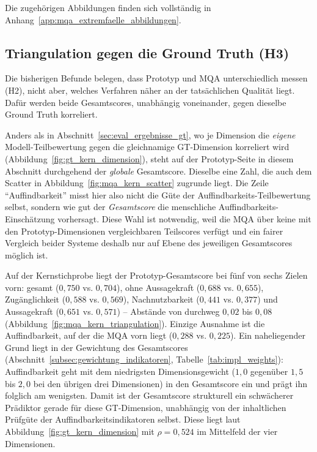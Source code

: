 Die zugehörigen Abbildungen finden sich vollständig in Anhang~\ref{app:mqa_extremfaelle_abbildungen}.

\subsection{Triangulation gegen die Ground Truth (H3)}

Die bisherigen Befunde belegen, dass Prototyp und MQA unterschiedlich messen (H2),
nicht aber, welches Verfahren näher an der tatsächlichen Qualität liegt. Dafür
werden beide Gesamtscores, unabhängig voneinander, gegen dieselbe
Ground Truth korreliert.

Anders als in Abschnitt~\ref{sec:eval_ergebnisse_gt}, wo je Dimension die
\emph{eigene} Modell-Teilbewertung gegen die gleichnamige GT-Dimension korreliert wird
(Abbildung~\ref{fig:gt_kern_dimension}), steht auf der Prototyp-Seite in diesem Abschnitt
durchgehend der \emph{globale} Gesamtscore. Dieselbe eine Zahl, die auch dem
Scatter in Abbildung~\ref{fig:mqa_kern_scatter} zugrunde liegt. Die Zeile
\enquote{Auffindbarkeit} misst hier also nicht die Güte der
Auffindbarkeits-Teilbewertung selbst, sondern wie gut der \emph{Gesamtscore} die
menschliche Auffindbarkeits-Einschätzung vorhersagt. Diese Wahl ist notwendig, weil
die MQA über keine mit den Prototyp-Dimensionen vergleichbaren Teilscores verfügt und
ein fairer Vergleich beider Systeme deshalb nur auf Ebene des jeweiligen Gesamtscores
möglich ist.

Auf der Kernstichprobe liegt der Prototyp-Gesamtscore
bei fünf von sechs Zielen vorn: gesamt ($0{,}750$ vs. $0{,}704$), ohne Aussagekraft
($0{,}688$ vs. $0{,}655$), Zugänglichkeit ($0{,}588$ vs. $0{,}569$),
Nachnutzbarkeit ($0{,}441$ vs. $0{,}377$) und Aussagekraft ($0{,}651$ vs.
$0{,}571$) -- Abstände von durchweg $0{,}02$ bis $0{,}08$
(Abbildung~\ref{fig:mqa_kern_triangulation}). Einzige Ausnahme ist die
Auffindbarkeit, auf der die MQA vorn liegt ($0{,}288$ vs. $0{,}225$). Ein naheliegender
Grund liegt in der Gewichtung des Gesamtscores (Abschnitt~\ref{subsec:gewichtung_indikatoren}, Tabelle~\ref{tab:impl_weights}):
Auffindbarkeit geht mit dem niedrigsten Dimensionsgewicht ($1{,}0$ gegenüber $1{,}5$
bis $2{,}0$ bei den übrigen drei Dimensionen) in den Gesamtscore ein und prägt ihn
folglich am wenigsten. Damit ist der Gesamtscore strukturell ein schwächerer
Prädiktor gerade für diese GT-Dimension, unabhängig von der inhaltlichen Prüfgüte der
Auffindbarkeitsindikatoren selbst. Diese liegt laut Abbildung~\ref{fig:gt_kern_dimension} mit
$\rho = 0{,}524$ im Mittelfeld der vier Dimensionen.

